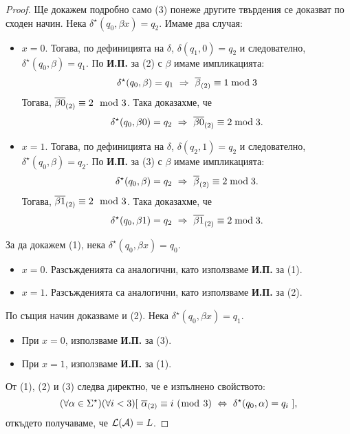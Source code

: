 \begin{proof}
  Ще докажем подробно само (3) понеже другите твърдения се доказват по сходен начин.
  Нека $\delta^\star(q_0,\beta x) = q_2$. 
  Имаме два случая:
  \begin{itemize}
  \item 
    $x = 0$. 
    Тогава, по дефиницията на $\delta$, 
    $\delta(q_1,0) = q_2$ и следователно, $\delta^\star(q_0,\beta) = q_1$.
    По {\bf И.П.} за (2) с $\beta$ имаме импликацията:
    \[\delta^\star(q_0,\beta) = q_1\ \Rightarrow\ \overline{\beta}_{(2)} \equiv 1 \bmod 3\]
    Тогава, $\overline{\beta0}_{(2)} \equiv 2 \mod 3$. Така доказахме, че
    \[\delta^\star(q_0,\beta 0) = q_2\ \Rightarrow\ \overline{\beta 0}_{(2)} \equiv 2 \bmod 3.\]
  \item
    $x = 1$.
    Тогава, по дефиницията на $\delta$, $\delta(q_2,1) = q_2$ и следователно,
    $\delta^\star(q_0,\beta) = q_2$.
    По {\bf И.П.} за (3) с $\beta$ имаме импликацията:
    \[\delta^\star(q_0,\beta) = q_2\ \Rightarrow\ \overline{\beta}_{(2)} \equiv 2 \bmod 3.\]
    Тогава, $\overline{\beta1}_{(2)} \equiv 2 \mod 3$. Така доказахме, че
    \[\delta^\star(q_0,\beta 1) = q_2\ \Rightarrow\ \overline{\beta 1}_{(2)} \equiv 2 \bmod 3.\]
  \end{itemize}
  За да докажем (1), нека $\delta^\star(q_0,\beta x) = q_0$. 
  \begin{itemize}
  \item 
    $x = 0$. Разсъжденията са аналогични, като използваме {\bf И.П.} за (1).
  \item
    $x = 1$. Разсъжденията са аналогични, като използваме {\bf И.П.} за (2).
  \end{itemize}
  
  По същия начин доказваме и (2). Нека $\delta^\star(q_0,\beta x) = q_1$. 
  \begin{itemize}
  \item 
    При $x = 0$, използваме {\bf И.П.} за (3).
  \item
    При $x = 1$, използваме {\bf И.П.} за (1).
  \end{itemize}
  От (1), (2) и (3) следва директно, че е изпълнено свойството:
  \[(\forall\alpha\in\Sigma^\star)(\forall i < 3)[\ \bin{\alpha} \equiv i\ (\bmod\ 3)\ \Leftrightarrow\ \delta^\star(q_0,\alpha) = q_i\ ],\]
  откъдето получаваме, че $\mathcal{L}(\mathcal{A}) = L$.
\end{proof}



